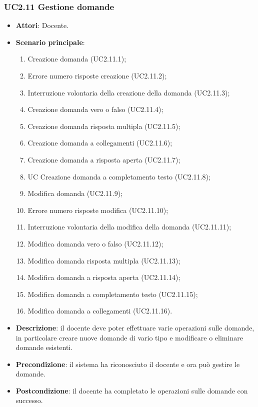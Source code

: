 \subsubsection{UC2.11 Gestione domande}
\begin{itemize}
\item \textbf{Attori}: Docente.
\item \textbf{Scenario principale}:
\begin{enumerate}
\item Creazione domanda (UC2.11.1);
\item Errore numero risposte creazione (UC2.11.2);
\item Interruzione volontaria della creazione della domanda (UC2.11.3);
\item Creazione domanda vero o falso (UC2.11.4);
\item Creazione domanda risposta multipla (UC2.11.5);
\item Creazione domanda a collegamenti (UC2.11.6);
\item Creazione domanda a risposta aperta (UC2.11.7);
\item UC Creazione domanda a completamento testo (UC2.11.8);
\item Modifica domanda (UC2.11.9);
\item Errore numero risposte modifica (UC2.11.10);
\item Interruzione volontaria della modifica della domanda (UC2.11.11);
\item Modifica domanda vero o falso (UC2.11.12);
\item Modifica domanda risposta multipla (UC2.11.13);
\item Modifica domanda a risposta aperta (UC2.11.14);
\item Modifica domanda a completamento testo (UC2.11.15);
\item Modifica domanda a collegamenti (UC2.11.16).
\end{enumerate}
\item \textbf{Descrizione}: il docente deve poter effettuare varie operazioni sulle domande, in particolare creare nuove domande di vario tipo e modificare o eliminare domande esistenti.
\item \textbf{Precondizione}: il sistema ha riconosciuto il docente e ora può gestire le domande.
\item \textbf{Postcondizione}: il docente ha completato le operazioni sulle domande con successo.
\end{itemize}
